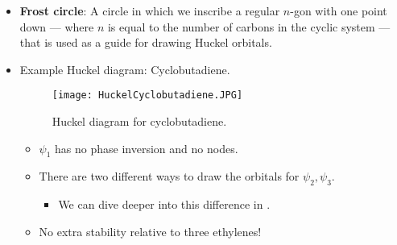 \documentclass[../notes.tex]{subfiles}
\begin{document}
\begin{itemize}
\begin{itemize}
\begin{itemize}
            \begin{itemize}
                \item See \textcite{bib:Anslyn} for more!!
            \end{itemize}
            \item $\psi_4,\psi_5$ have 2 nodes at angles.
            \item For $\psi_6$, we have 3 nodes through a hexagon, which is alternating shading.
        \end{itemize}
        \item $\alpha$ is the nonbonding level; higher is antibonding, lower is bonding.
        \item 6 electrons in benzene's bonding $\pi$-system yields stabilization.
        \begin{itemize}
            \item In particular, we observe stabilization relative to three ethylenes: An extra \SI[per-mode=symbol]{36}{\kilo\calorie\per\mole} of stabilization!
            \item Huckel theory can't really compare energy between two molecules; $\beta$ is more a qualitative parameter than a quantitative one.
        \end{itemize}
    \end{itemize}
    \item \textbf{Frost circle}: A circle in which we inscribe a regular $n$-gon with one point down --- where $n$ is equal to the number of carbons in the cyclic system --- that is used as a guide for drawing Huckel orbitals.
    \item Example Huckel diagram: Cyclobutadiene.
    \begin{figure}[h!]
        \centering
        \texttt{[image: HuckelCyclobutadiene.JPG]}
        \caption{Huckel diagram for cyclobutadiene.}
        \label{fig:HuckelCyclobutadiene}
    \end{figure}
    \begin{itemize}
        \item $\psi_1$ has no phase inversion and no nodes.
        \item There are two different ways to draw the orbitals for $\psi_2,\psi_3$.
        \begin{itemize}
            \item We can dive deeper into this difference in \textcite{bib:Anslyn}.
        \end{itemize}
        \item No extra stability relative to three ethylenes!

\end{itemize}
\end{itemize}
\end{document}
